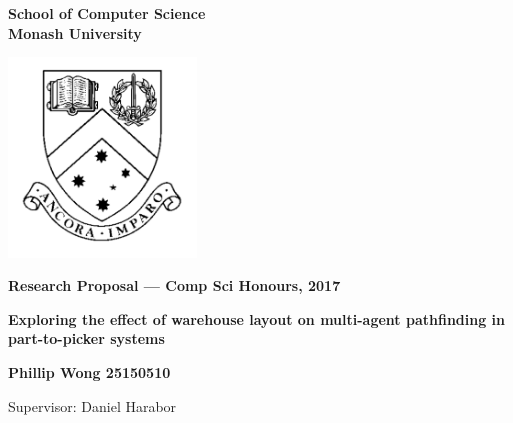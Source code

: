 \documentclass[a4paper,11pt]{article}
\begin{document}
\thispagestyle{empty} %
\renewcommand{\thepage}{\roman{page}}

\begin{spacing}{1.5}
\begin{center}
{\Large \bfseries
School of Computer Science \\
Monash University}

\vspace*{30mm}

\includegraphics[width=5cm]{graphics/MonashCrest.pdf}

\vspace*{15mm}

{\large \bfseries
Research Proposal --- Comp Sci Honours, 2017
}

\vspace*{10mm}

{\LARGE \bfseries
Exploring the effect of warehouse layout on multi-agent pathfinding in part-to-picker systems
}

\vspace*{20mm}

{\large \bfseries
Phillip Wong 25150510

\vspace*{20mm}


Supervisor: Daniel Harabor
}

\end{center}
\end{spacing}

\newpage

\tableofcontents

\newpage
\setcounter{page}{1}
\renewcommand{\thepage}{\arabic{page}}
\end{document}
